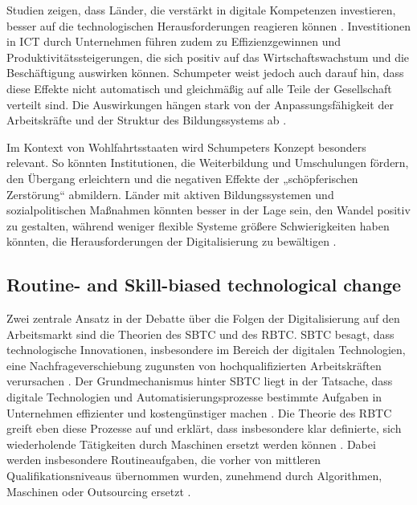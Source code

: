 Studien zeigen, dass Länder, die verstärkt in digitale Kompetenzen investieren, besser auf die 
technologischen Herausforderungen reagieren können \parencite[S. 15–17]{oecd2019measuring}. 
Investitionen in \ac{ICT} durch Unternehmen führen zudem zu Effizienzgewinnen und 
Produktivitätssteigerungen, die sich positiv auf das Wirtschaftswachstum und die Beschäftigung 
auswirken können. Schumpeter weist jedoch auch darauf hin, dass diese Effekte nicht automatisch 
und gleichmäßig auf alle Teile der Gesellschaft verteilt sind. Die Auswirkungen hängen stark von 
der Anpassungsfähigkeit der Arbeitskräfte und der Struktur des Bildungssystems ab 
\parencite[S. 48]{oecd2019measuring}.

Im Kontext von Wohlfahrtsstaaten wird Schumpeters Konzept besonders relevant. So könnten 
Institutionen, die Weiterbildung und Umschulungen fördern, den Übergang erleichtern und die 
negativen Effekte der „schöpferischen Zerstörung“ abmildern. Länder mit aktiven Bildungssystemen 
und sozialpolitischen Maßnahmen könnten besser in der Lage sein, den Wandel positiv zu gestalten, 
während weniger flexible Systeme größere Schwierigkeiten haben könnten, die Herausforderungen der 
Digitalisierung zu bewältigen \parencite[vgl.][S. 29–31]{espingandersen1990thethree}.


\subsection{Routine- and Skill-biased technological change}

Zwei zentrale Ansatz in der Debatte über die Folgen der Digitalisierung auf den Arbeitsmarkt sind 
die Theorien des \ac{SBTC} und des \ac{RBTC}. \ac{SBTC} besagt, dass technologische Innovationen, 
insbesondere im Bereich der digitalen Technologien, eine Nachfrageverschiebung zugunsten von 
hochqualifizierten Arbeitskräften verursachen \parencite[vgl.][S. 1]{violante2008skill}. Der 
Grundmechanismus hinter \ac{SBTC} liegt in der Tatsache, dass digitale Technologien und 
Automatisierungsprozesse bestimmte Aufgaben in Unternehmen effizienter und kostengünstiger machen 
\parencite[vgl.][S. 2–3]{violante2008skill}. Die Theorie des \ac{RBTC} greift eben diese Prozesse 
auf und erklärt, dass insbesondere klar definierte, sich wiederholende Tätigkeiten durch 
Maschinen ersetzt werden können \parencite[vgl.][S. 2509–2510]{goos2014explaining}. Dabei werden 
insbesondere Routineaufgaben, die vorher von mittleren Qualifikationsniveaus übernommen wurden, 
zunehmend durch Algorithmen, Maschinen oder Outsourcing ersetzt 
\parencite[vgl.][S. 1279]{autor2003theskill}.

